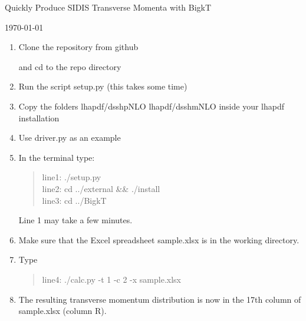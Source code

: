 \documentclass[12pt]{article}
\newcommand{\rquote}[1]{\textcolor{red}{ \begin{quote} #1 \end{quote}}}
\newcommand\3[1]{\boldsymbol{#1}}
\begin{document}
\centerline{Quickly Produce SIDIS Transverse Momenta with BigkT}
\centerline{\today}
\vspace{.25in}
\begin{enumerate}

\item Clone the repository from github




and cd to the repo directory

\item Run the script setup.py (this takes some time)
\item Copy the folders lhapdf/dsshpNLO  lhapdf/dsshmNLO inside your lhapdf installation
\item Use driver.py as an example



\item In the terminal type:
\rquote{
line1:  ./setup.py \\
line2:  cd ../external \&\& ./install \\
line3:  cd ../BigkT} 
Line 1 may take a few minutes.
\item Make sure that the Excel spreadsheet sample.xlsx is in the working directory. 
\item Type
\rquote{
line4:  ./calc.py  -t 1 -c 2 -x sample.xlsx} 
\item The resulting transverse momentum distribution is now in the 17th column of sample.xlsx (column R).
\end{enumerate}

% 
\end{document}
